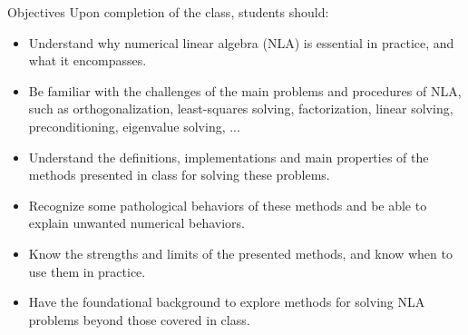 \documentclass[t,usepdftitle=false]{beamer}
\begin{document}
\begin{frame}{Objectives}
Upon completion of the class, students should:
\begin{itemize}
\item Understand why numerical linear algebra (NLA) is essential in practice, and what it encompasses.
\item Be familiar with the challenges of the main problems and procedures of NLA, such as orthogonalization, least-squares solving, factorization, linear solving, preconditioning, eigenvalue solving, ...
\item Understand the definitions, implementations and main properties of the methods presented in class for solving these problems.
\item Recognize some pathological behaviors of these methods and be able to explain unwanted numerical behaviors.
\item Know the strengths and limits of the presented methods, and know when to use them in practice.
\item Have the foundational background to explore methods for solving NLA problems beyond those covered in class.
\end{itemize}
\end{frame}
\end{document}
